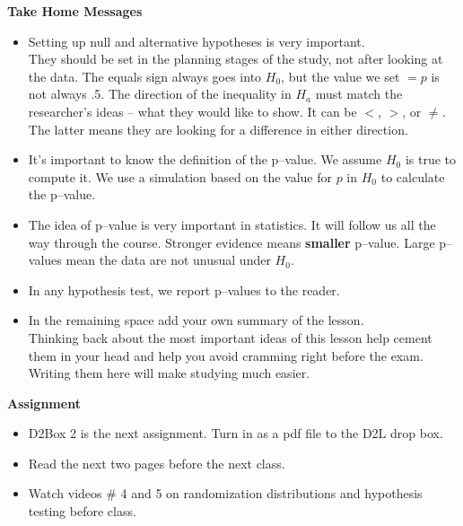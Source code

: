 {\bf Take Home Messages}
\begin{itemize}
  \item Setting up null and alternative hypotheses is very
    important.\\
    They should be set in the planning stages of the study, not after
    looking at the data. 
    The equals sign always goes into $H_0$, but the value we set $ = p$ is not
    always .5.  The direction of the inequality in $H_a$ must match
    the researcher's ideas -- what they would like to show. It can be
    $<$, $>$, or $\neq$.  The latter means they are looking for a
    difference in either direction.
  \item It's important to know the definition of the p--value. We
    assume $H_0$ is true to compute it.  We  use a simulation based
    on the  value for $p$  in $H_0$ to calculate the p--value.    
  \item The idea of p--value is very important in statistics. It will
    follow us all the way through the course. Stronger evidence means
    {\bf smaller} p--value.  Large p--values mean the data are not
    unusual under $H_0$.
  \item In any hypothesis test, we report p--values to the reader.  
 \item 
  In the remaining space add your own summary of the lesson. \\
  Thinking back about the most important ideas of this lesson help
  cement them in your head and help you avoid cramming right before
  the exam.  Writing them here will make studying much easier.   
\end{itemize}\vfill

{\bf Assignment}
\begin{itemize}
\item  D2Box 2 is the next assignment.  Turn in as a pdf file to the D2L
  drop box.
\item Read the next two pages before the next class.
\item Watch videos \# 4 and  5 on randomization distributions and
  hypothesis testing before class. 
\end{itemize}


